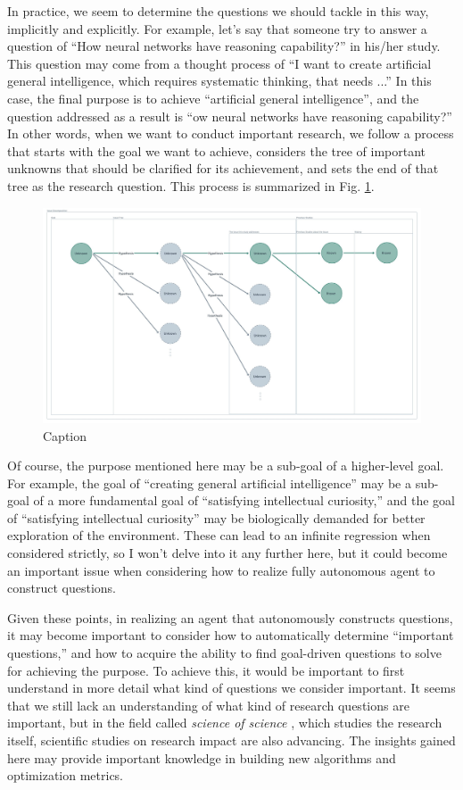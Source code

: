 \documentclass{book}
\begin{document}
In practice, we seem to determine the questions we should tackle in this way, implicitly and explicitly. For example, let's say that someone try to answer a question of ``How neural networks have reasoning capability?'' in his/her study. This question may come from a thought process of ``I want to create artificial general intelligence, which requires systematic thinking, that needs ...'' In this case, the final purpose is to achieve ``artificial general intelligence'', and the question addressed as a result is ``ow neural networks have reasoning capability?'' In other words, when we want to conduct important research, we follow a process that starts with the goal we want to achieve, considers the tree of important unknowns that should be clarified for its achievement, and sets the end of that tree as the research question. This process is summarized in Fig. \ref{fig:unknown_tree}.

\begin{figure}[htb]
    \centering
    \includegraphics[width=\textwidth]{figs/unknown_tree.jpeg}
    \caption{Caption}
    \label{fig:unknown_tree}
\end{figure}

Of course, the purpose mentioned here may be a sub-goal of a higher-level goal. For example, the goal of ``creating general artificial intelligence'' may be a sub-goal of a more fundamental goal of ``satisfying intellectual curiosity,'' and the goal of ``satisfying intellectual curiosity'' may be biologically demanded for better exploration of the environment. These can lead to an infinite regression when considered strictly, so I won't delve into it any further here, but it could become an important issue when considering how to realize fully autonomous agent to construct questions.

Given these points, in realizing an agent that autonomously constructs questions, it may become important to consider how to automatically determine ``important questions,'' and how to acquire the ability to find goal-driven questions to solve for achieving the purpose. To achieve this, it would be important to first understand in more detail what kind of questions we consider important. It seems that we still lack an understanding of what kind of research questions are important, but in the field called \textit{science of science} \cite{wang2021}, which studies the research itself, scientific studies on research impact are also advancing. The insights gained here may provide important knowledge in building new algorithms and optimization metrics.
\end{document}
